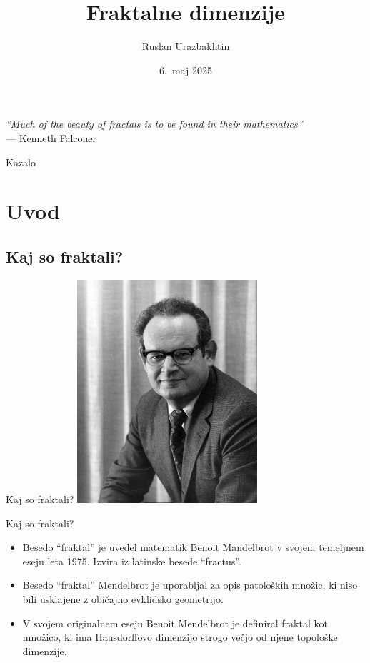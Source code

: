 \documentclass[10pt]{beamer}
\title[Fraktalne dimenzije]{Fraktalne dimenzije}
\author{Ruslan Urazbakhtin}
\institute{Fakulteta za matematiko in fiziko, Univerza v Ljubljani}
\date{6.\ maj 2025}
\begin{document}
\begin{frame}
  \titlepage

  \vfill %

  \begin{flushright}
    \small
    \textit{"`Much of the beauty of fractals is to be found in their mathematics"'} \\
    \hspace{1em} --- Kenneth Falconer
  \end{flushright}
\end{frame}

\begin{frame}{Kazalo}
  \tableofcontents
\end{frame}

\section{Uvod}
\subsection{Kaj so fraktali?}

\begin{frame}{Kaj so fraktali?}
    \centering
    \includegraphics[width=0.5\textwidth]{img/mandelbrot.jpg} %
\end{frame}

\begin{frame}{Kaj so fraktali?}
    \begin{itemize}
        \item Besedo "`fraktal"' je uvedel matematik Benoit Mandelbrot v svojem temeljnem eseju leta 1975. Izvira iz latinske besede "`fractus"'. 
        \item Besedo "`fraktal"' Mendelbrot je uporabljal za opis patoloških množic, ki niso bili usklajene z običajno evklidsko geometrijo.
        \item V svojem originalnem eseju Benoit Mendelbrot je definiral fraktal kot množico, ki ima Hausdorffovo dimenzijo strogo večjo od njene topološke dimenzije. 
    \end{itemize}    
\end{frame}
\end{document}
